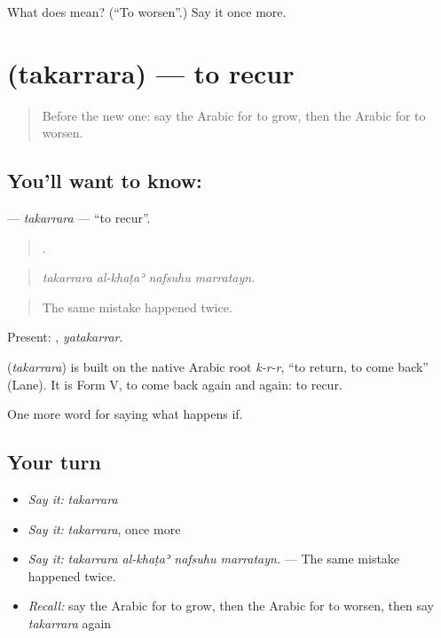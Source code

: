 \begin{tcolorbox}[breakable,colback=teal!4,colframe=teal!35!black,title={Before you move on}]
What does  mean? (\textquotedblleft{}To worsen\textquotedblright{}.) Say it once more.
\end{tcolorbox}
\section[\texorpdfstring{\ar{تكرر} (takarrara)}{تكرر (takarrara)}]{ (takarrara) — to recur}

\label{lesson:AR-C413-takarrara}



\begin{quote}
Before the new one: say the Arabic for to grow, then the Arabic for to worsen.
\end{quote}

\subsection*{You'll want to know: }
\textbf{} — \emph{takarrara} — \textquotedblleft{}to recur\textquotedblright{}.

\begin{quote}
   .
\end{quote}

\begin{quote}
\emph{takarrara al-khaṭaʾ nafsuhu marratayn.}
\end{quote}

\begin{quote}
The same mistake happened twice.
\end{quote}

Present: , \emph{yatakarrar}.

\begin{cousinweb}
\textbf{} (\emph{takarrara}) is built on the native Arabic root \emph{k-r-r}, \textquotedblleft{}to return, to come back\textquotedblright{} (Lane). It is Form V, to come back again and again: to recur.
\end{cousinweb}

\begin{grammarlens}[title={What you've built}]
One more word for saying what happens if.
\end{grammarlens}

\subsection*{Your turn}
\begin{itemize}
\raggedright
  \item \emph{Say it:} \emph{takarrara}
  \item \emph{Say it:} \emph{takarrara}, once more
  \item \emph{Say it:} \emph{takarrara al-khaṭaʾ nafsuhu marratayn.} — The same mistake happened twice.
  \item \emph{Recall:} say the Arabic for to grow, then the Arabic for to worsen, then say \emph{takarrara} again
\end{itemize}

